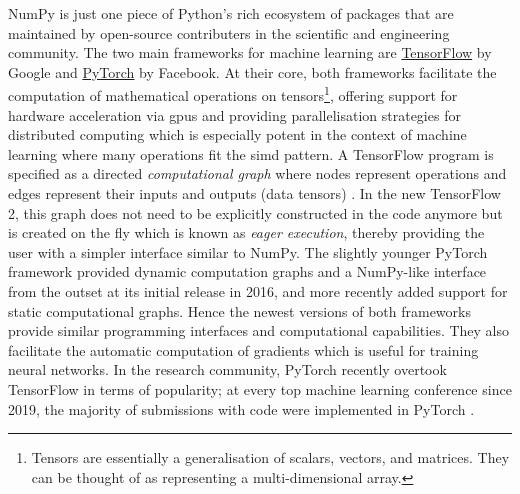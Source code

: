 NumPy is just one piece of Python's rich ecosystem of packages that are maintained by open-source contributers in the scientific and engineering community.
The two main frameworks for machine learning are \href{https://www.tensorflow.org/}{TensorFlow} by Google and \href{https://www.pytorch.org/}{PyTorch} by Facebook. 
At their core, both frameworks facilitate the computation of mathematical operations on tensors\footnote{Tensors are essentially a generalisation of scalars, vectors, and matrices. They can be thought of as representing a multi-dimensional array.}, offering support for hardware acceleration via \glspl{gpu} and providing parallelisation strategies for distributed computing which is especially potent in the context of machine learning where many operations fit the \gls{simd} pattern.
A TensorFlow program is specified as a directed \textit{computational graph} where nodes represent operations and edges represent their inputs and outputs (data tensors) \cite{tensorflow2015whitepaper}.
In the new TensorFlow 2, this graph does not need to be explicitly constructed in the code anymore but is created on the fly which is known as \textit{eager execution}, thereby providing the user with a simpler interface similar to NumPy.
The slightly younger PyTorch framework \cite{pytorch2019} provided dynamic computation graphs and a NumPy-like interface from the outset at its initial release in 2016, and more recently added support for static computational graphs.
Hence the newest versions of both frameworks provide similar programming interfaces and computational capabilities.
They also facilitate the automatic computation of gradients which is useful for training neural networks. 
In the research community, PyTorch recently overtook TensorFlow in terms of popularity; at every top machine learning conference since 2019, the majority of submissions with code were implemented in PyTorch \cite{he2019}.
